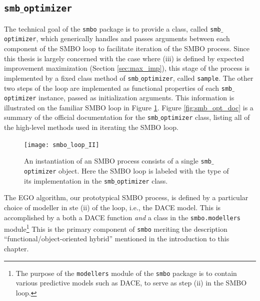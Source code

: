 \subsection{\texttt{smb$\_$optimizer}}

The technical goal of the \texttt{smbo} package is to provide a class, called \texttt{smb$\_$optimizer}, which generically handles and passes arguments between each component of the SMBO loop to facilitate iteration of the SMBO process. Since this thesis is largely concerned with the case where (iii) is defined by expected improvement maximization (Section \ref{sec:max_imp}), this stage of the process is implemented by a fixed class method of \texttt{smb$\_$optimizer}, called \texttt{sample}. The other two steps of the loop are implemented as functional properties of each \texttt{smb$\_$optimizer} instance, passed as initialization arguments. This information is illustrated on the familiar SMBO loop in Figure \ref{fig:smbo_loop_II}. Figure \ref{fig:smb_opt_doc} is a summary of the official documentation for the \texttt{smb$\_$optimizer} class, listing all of the high-level methods used in iterating the SMBO loop.

\begin{figure}[h]
	\centering
	\texttt{[image: smbo\_loop\_II]}
	\caption{An instantiation of an SMBO process consists of a single \texttt{smb$\_$optimizer} object. Here the SMBO loop is labeled with the type of its implementation in the \texttt{smb$\_$optimizer} class.}
	\label{fig:smbo_loop_II}

\end{figure}


\begin{minipage}{\textwidth}
\begin{framed}

\end{framed}


\end{minipage}




The EGO algorithm, our prototypical SMBO process, is defined by a particular choice of modeller in ste (ii) of the loop, i.e., the DACE model. This is accomplished by a both a DACE function \emph{and} a class in the \texttt{smbo.modellers} module\footnote{The purpose of the \texttt{modellers} module of the \texttt{smbo} package is to contain various predictive models such as DACE, to serve as step (ii) in the SMBO loop.} This is the primary component of \texttt{smbo} meriting the description ``functional/object-oriented hybrid'' mentioned in the introduction to this chapter.

